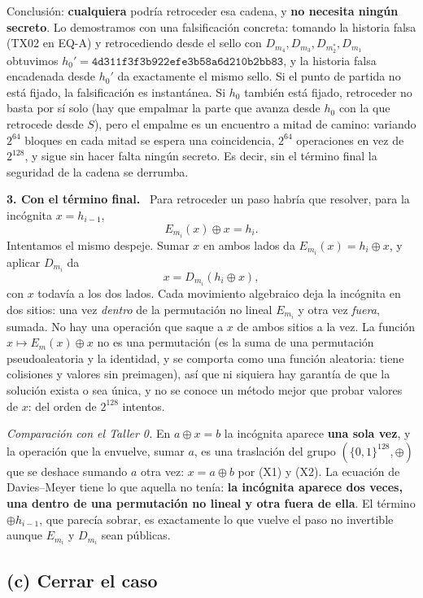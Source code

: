 \documentclass[11pt,letterpaper]{article}
\newcommand{\xor}{\oplus}
\newcommand{\B}{\{0,1\}^{128}}
\newcommand{\paso}[1]{\par\smallskip\noindent\textbf{#1.}\ }
\begin{document}
Conclusión: \textbf{cualquiera} podría retroceder esa cadena, y \textbf{no necesita ningún secreto}.
Lo demostramos con una falsificación concreta: tomando la historia falsa (TX02 en EQ-A) y retrocediendo desde
el sello con $D_{m_4}, D_{m_3}, D_{m_2^*}, D_{m_1}$ obtuvimos
$h_0' = \texttt{4d311f3f3b922efe3b58a6d210b2bb83}$, y la historia falsa encadenada desde $h_0'$ da
exactamente el mismo sello. Si el punto de partida no está fijado, la falsificación es instantánea.
Si $h_0$ también está fijado, retroceder no basta por sí solo (hay que empalmar la parte que avanza desde $h_0$ con
la que retrocede desde $S$), pero el empalme es un encuentro a mitad de camino: variando $2^{64}$ bloques
en cada mitad se espera una coincidencia, $2^{64}$ operaciones en vez de $2^{128}$, y sigue sin hacer falta
ningún secreto. Es decir, sin el término final la seguridad de la cadena se derrumba.

\paso{3. Con el término final}
Para retroceder un paso habría que resolver, para la incógnita $x=h_{i-1}$,
\[
  E_{m_i}(x)\xor x = h_i .
\]
Intentamos el mismo despeje. Sumar $x$ en ambos lados da $E_{m_i}(x) = h_i\xor x$, y aplicar $D_{m_i}$ da
\[
  x = D_{m_i}(h_i\xor x),
\]
con $x$ todavía a los dos lados. Cada movimiento algebraico deja la incógnita en dos sitios: una vez
\emph{dentro} de la permutación no lineal $E_{m_i}$ y otra vez \emph{fuera}, sumada. No hay una operación que
saque a $x$ de ambos sitios a la vez. La función $x\mapsto E_m(x)\xor x$ no es una permutación (es la suma de una
permutación pseudoaleatoria y la identidad, y se comporta como una función aleatoria: tiene colisiones y valores sin
preimagen), así que ni siquiera hay garantía de que la solución exista o sea única, y no se conoce un método mejor que
probar valores de $x$: del orden de $2^{128}$ intentos.

\emph{Comparación con el Taller 0.} En $a\xor x = b$ la incógnita aparece \textbf{una sola vez}, y la operación que la
envuelve, sumar $a$, es una traslación del grupo $(\B,\xor)$ que se deshace sumando $a$ otra vez:
$x = a\xor b$ por (X1) y (X2). La ecuación de Davies--Meyer tiene lo que aquella no tenía: \textbf{la incógnita aparece dos
veces, una dentro de una permutación no lineal y otra fuera de ella}. El término $\xor h_{i-1}$, que parecía sobrar,
es exactamente lo que vuelve el paso no invertible aunque $E_{m_i}$ y $D_{m_i}$ sean públicas.

\subsection*{(c) Cerrar el caso}
\end{document}
